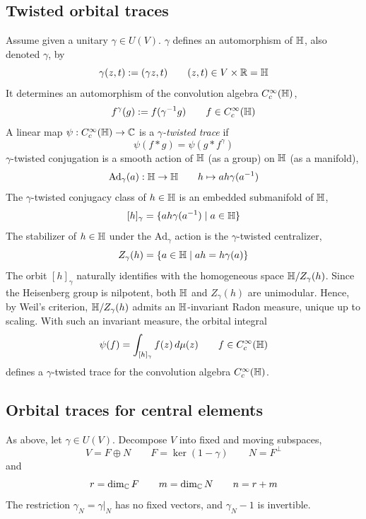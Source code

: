 \documentclass[11pt]{amsart}
\theoremstyle{plain}
\theoremstyle{definition}
\theoremstyle{remark}
\begin{document}
\subsection{Twisted orbital traces}
Assume given a unitary $\gamma \in U(V)$.
$\gamma$ defines an automorphism of $\mathbb{H}$, also denoted $\gamma$, by
\[\gamma(z, t):= (\gamma z, t)\qquad (z,t)\in V\times {\mathbb{R}} = \mathbb{H}\]
It determines an automorphism of the convolution algebra $C_c^\infty(\mathbb{H})$,
\[f^\gamma(g):=f(\gamma^{-1}g)\qquad f\in C_c^\infty(\mathbb{H})\]
A linear map $\psi:C_c^\infty(\mathbb{H})\to {\mathbb{C}}$
is a \emph{$\gamma$-twisted trace} if
\[ \psi(f*g)=\psi(g*f^\gamma) \]
$\gamma$-twisted conjugation is a smooth action of $\mathbb{H}$ (as a group) on $\mathbb{H}$ (as a manifold),
\[ \mathrm{Ad}_\gamma(a): \mathbb{H}\to \mathbb{H}\qquad h \mapsto a h \gamma(a^{-1})\]
The $\gamma$-twisted conjugacy class of $h\in \mathbb{H}$ is an embedded submanifold of $\mathbb{H}$,
\[ [h]_\gamma = \{a h \gamma(a^{-1})\mid a\in \mathbb{H}\}\]
The stabilizer of $h\in \mathbb{H}$ under the $\mathrm{Ad}_\gamma$ action is the $\gamma$-twisted centralizer,
\[
    Z_\gamma(h) =\{a \in \mathbb{H}\mid a h = h \gamma(a) \}
\]
The orbit $[h]_\gamma$ naturally identifies with the homogeneous space $\mathbb{H}/Z_\gamma(h)$.
Since the Heisenberg group is nilpotent, both $\mathbb{H}$ and $Z_\gamma(h)$ are unimodular.
Hence, by Weil's criterion, $\mathbb{H}/Z_\gamma(h)$ admits an $\mathbb{H}$-invariant Radon measure, unique up to scaling.
With such an invariant measure, the orbital integral
\[ \psi(f) = \int_{[h]_\gamma} f(z)\,d\mu(z)\qquad f\in C_c^\infty(\mathbb{H})\]
defines a $\gamma$-twisted trace for the convolution algebra $C_c^\infty(\mathbb{H})$.


\subsection{Orbital traces for central elements}\label{sec:twisted orbital traces on Heis}
As above, let $\gamma \in U(V)$.
Decompose $V$ into fixed and moving subspaces,
\[
      V=F\oplus N      \qquad F=\ker(1-\gamma)\qquad N=F^\perp
\]
and
\[
      r=\dim_{{\mathbb{C}}}F\qquad m=\dim_{{\mathbb{C}}}N\qquad n=r+m
\]
The restriction $\gamma_N=\gamma|_N$ has no fixed vectors, and $\gamma_N-1$ is invertible.
\end{document}
